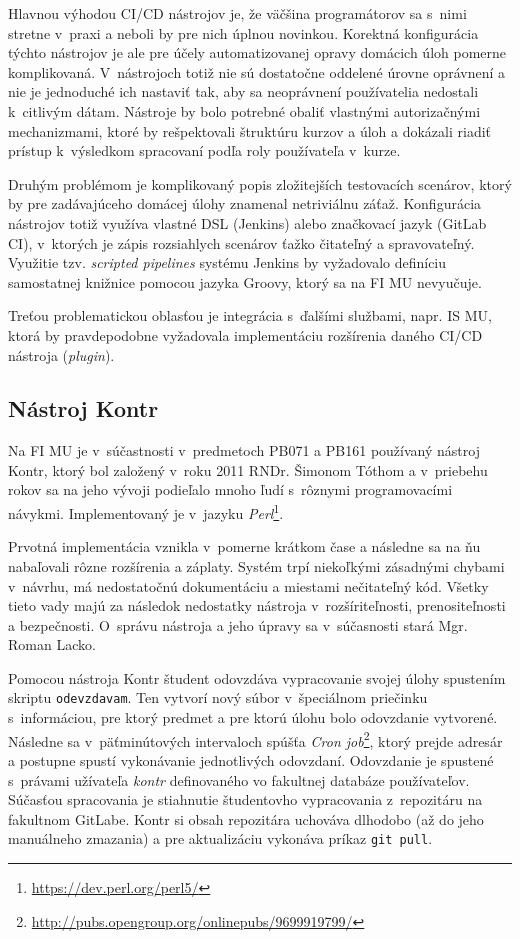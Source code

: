 \documentclass[
  digital, %
  oneside, %
  table,   %
  lof,     %
  lot,   %
]{fithesis3}
\begin{document}
Hlavnou výhodou CI/CD nástrojov je, že väčšina programátorov sa s~nimi stretne v~praxi a neboli by pre nich úplnou novinkou. Korektná konfigurácia týchto nástrojov je ale pre účely automatizovanej opravy domácich úloh pomerne komplikovaná. V~nástrojoch totiž nie sú dostatočne oddelené úrovne oprávnení a nie je jednoduché ich nastaviť tak, aby sa neoprávnení používatelia nedostali k~citlivým dátam. Nástroje by bolo potrebné obaliť vlastnými autorizačnými mechanizmami, ktoré by rešpektovali štruktúru kurzov a úloh a dokázali riadiť prístup k~výsledkom spracovaní podľa roly používateľa v~kurze.

Druhým problémom je komplikovaný popis zložitejších testovacích scenárov, ktorý by pre zadávajúceho domácej úlohy znamenal netriviálnu záťaž. Konfigurácia nástrojov totiž využíva vlastné DSL (Jenkins) alebo značkovací jazyk (GitLab CI), v~ktorých je zápis rozsiahlych scenárov ťažko čitateľný a spravovateľný. Využitie tzv. \textit{scripted pipelines} systému Jenkins by vyžadovalo definíciu samostatnej knižnice pomocou jazyka Groovy, ktorý sa na FI MU nevyučuje.

Treťou problematickou oblasťou je integrácia s~ďalšími službami, napr. IS MU, ktorá by pravdepodobne vyžadovala implementáciu rozšírenia daného CI/CD nástroja (\emph{plugin}).

\subsection{Nástroj Kontr}

Na FI MU je v~súčastnosti v~predmetoch PB071 a PB161 používaný nástroj Kontr, ktorý bol založený v~roku 2011 RNDr. Šimonom Tóthom a v~priebehu rokov sa na jeho vývoji podieľalo mnoho ľudí s~rôznymi programovacími návykmi. Implementovaný je v~jazyku \emph{Perl}\footnote{\url{https://dev.perl.org/perl5/}}.

Prvotná implementácia vznikla v~pomerne krátkom čase a následne sa na ňu nabaľovali rôzne rozšírenia a záplaty. Systém trpí niekoľkými zásadnými chybami v~návrhu, má nedostatočnú dokumentáciu a miestami nečitateľný kód. Všetky tieto vady majú za následok nedostatky nástroja v~rozšíriteľnosti, prenositeľnosti a bezpečnosti. O~správu nástroja a jeho úpravy sa v~súčasnosti stará Mgr. Roman Lacko. 

Pomocou nástroja Kontr študent odovzdáva vypracovanie svojej úlohy spustením skriptu \texttt{odevzdavam}. Ten vytvorí nový súbor v~špeciálnom priečinku s~informáciou, pre ktorý predmet a pre ktorú úlohu bolo odovzdanie vytvorené. Následne sa v~päťminútových intervaloch spúšťa \textit{Cron job}\footnote{\url{http://pubs.opengroup.org/onlinepubs/9699919799/}}, ktorý prejde adresár a postupne spustí vykonávanie jednotlivých odovzdaní. Odovzdanie je spustené s~právami užívateľa \emph{kontr} definovaného vo fakultnej databáze používateľov. Súčasťou spracovania je stiahnutie študentovho vypracovania z~repozitáru na fakultnom GitLabe. Kontr si obsah repozitára uchováva dlhodobo (až do jeho manuálneho zmazania) a pre aktualizáciu vykonáva príkaz \texttt{git pull}. 
\end{document}
